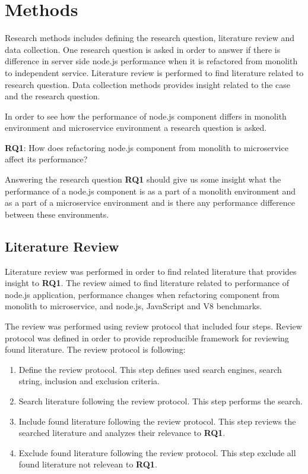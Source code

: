\chapter{Methods\label{methods}}
Research methods includes defining the research question, literature review and data collection.
One research question is asked in order to answer if there is difference in server side node.js performance when it is refactored from monolith to independent service.
Literature review is performed to find literature related to research question.
Data collection methods provides insight related to the case and the research question.

In order to see how the performance of node.js component differs in monolith environment and microservice environment a research question is asked.

\textbf{RQ1}: How does refactoring node.js component from monolith to microservice affect its performance?

Answering the research question \textbf{RQ1} should give us some insight what the performance of a node.js component is as a part of a monolith environment and as a part of a microservice environment and is there any performance difference between these environments.

\section{Literature Review}
Literature review was performed in order to find related literature that provides insight to \textbf{RQ1}.
The review aimed to find literature related to performance of node.js application, performance changes when refactoring component from monolith to microservice, and node.js, JavaScript and V8 benchmarks.

The review was performed using review protocol that included four steps.
Review protocol was defined in order to provide reproducible framework for reviewing found literature.
The review protocol is following:
\begin{enumerate}
    \item Define the review protocol. This step defines used search engines, search string, inclusion and exclusion criteria.
    \item Search literature following the review protocol. This step performs the search.
    \item Include found literature following the review protocol. This step reviews the searched literature and analyzes their relevance to \textbf{RQ1}.
    \item Exclude found literature following the review protocol. This step exclude all found literature not relevean to \textbf{RQ1}.
\end{enumerate}

